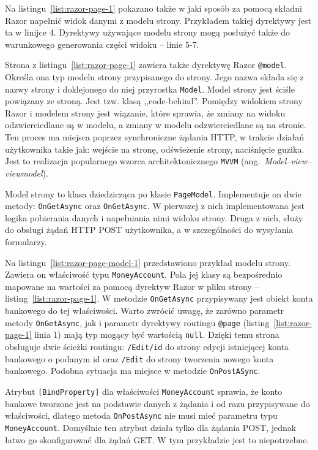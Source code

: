 Na listingu~\ref{list:razor-page-1} pokazano także w jaki sposób za pomocą składni Razor napełnić widok danymi z modelu strony. Przykładem takiej dyrektywy jest ta w linijce 4. Dyrektywy używające modelu strony mogą posłużyć także do warunkowego generowania części widoku -- linie 5-7.

Strona z listingu~\ref{list:razor-page-1} zawiera także dyrektywę Razor \texttt{@model}. Określa ona typ modelu strony przypisanego do strony. Jego nazwa składa się z nazwy strony i doklejonego do niej przyrostka \texttt{Model}. Model strony jest ściśle powiązany ze stroną. Jest tzw. klasą ,,code-behind''. Pomiędzy widokiem strony Razor i modelem strony jest wiązanie, które sprawia, że zmiany na widoku odzwierciedlane są w modelu, a zmiany w modelu odzwierciedlane są na stronie. Ten proces ma miejsca poprzez synchroniczne żądania HTTP, w trakcie działań użytkownika takie jak: wejście na stronę, odświeżenie strony, naciśnięcie guzika. Jest to realizacja popularnego wzorca architektonicznego \texttt{MVVM} (ang.~\emph{Model–view–viewmodel}).

Model strony to klasa dziedzicząca po klasie \texttt{PageModel}. Implementuje on dwie metody: \texttt{OnGetAsync} oraz \texttt{OnGetAsync}. W pierwszej z nich implementowana jest logika pobierania danych i napełniania nimi widoku strony. Druga z nich, służy do obsługi żądań HTTP POST użytkownika, a w szczególności do wysyłania formularzy. 

Na listingu~\ref{list:razor-page-model-1} przedstawiono przykład modelu strony. Zawiera on właściwość typu \texttt{MoneyAccount}. Pola jej klasy są bezpośrednio mapowane na wartości za pomocą dyrektyw Razor w pliku strony -- listing~\ref{list:razor-page-1}. W metodzie \texttt{OnGetAsync} przypisywany jest obiekt konta bankowego do tej właściwości. Warto zwrócić uwagę, że zarówno parametr metody \texttt{OnGetAsync}, jak i parametr dyrektywy routingu \texttt{@page} (listing~\ref{list:razor-page-1} linia 1) mają typ mogący być wartością \texttt{null}. Dzięki temu strona obsługuje dwie ścieżki routingu: \texttt{/Edit/{id}} do strony edycji istniejącej konta bankowego o podanym id oraz \texttt{/Edit} do strony tworzenia nowego konta bankowego. Podobna sytuacja ma miejsce w metodzie \texttt{OnPostASync}.

Atrybut \texttt{[BindProperty]} dla właściwości \texttt{MoneyAccount} sprawia, że konto bankowe tworzone jest na podstawie danych z żądania i od razu przypisywane do właściwości, dlatego metoda \texttt{OnPostAsync} nie musi mieć parametru typu \texttt{MoneyAccount}. Domyślnie ten atrybut działa tylko dla żądania POST, jednak łatwo go skonfigurować dla żądań GET. W tym przykładzie jest to niepotrzebne.

